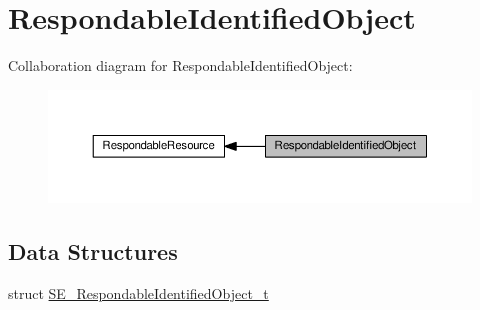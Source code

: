 \hypertarget{group__RespondableIdentifiedObject}{}\section{Respondable\+Identified\+Object}
\label{group__RespondableIdentifiedObject}
Collaboration diagram for Respondable\+Identified\+Object\+:\nopagebreak
\begin{figure}[H]
\begin{center}
\leavevmode
\includegraphics[width=350pt]{group__RespondableIdentifiedObject}
\end{center}
\end{figure}
\subsection*{Data Structures}
\begin{DoxyCompactItemize}
\item 
struct \hyperlink{structSE__RespondableIdentifiedObject__t}{S\+E\+\_\+\+Respondable\+Identified\+Object\+\_\+t}
\end{DoxyCompactItemize}
